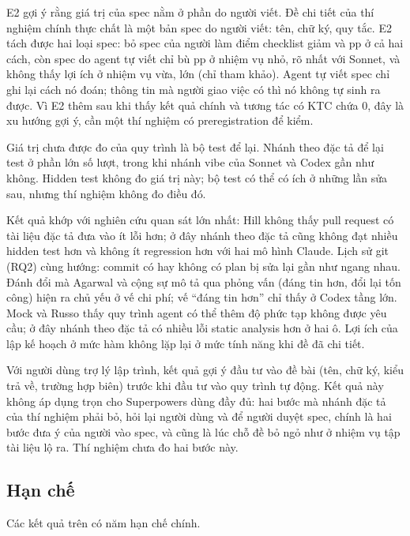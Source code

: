 E2 gợi ý rằng giá trị của spec nằm ở phần do người viết. Đề chi tiết của thí nghiệm chính thực chất là một bản spec do
người viết: tên, chữ ký, quy tắc. E2 tách được hai loại spec: bỏ spec của người làm điểm checklist giảm
\NumETwoXScoreShiftSpec{} và \NumETwoXScoreShiftVibe{} pp ở cả hai cách, còn spec do agent tự viết chỉ bù
\NumETwoPooledSmallPp{} pp ở nhiệm vụ nhỏ, rõ nhất với Sonnet, và không thấy lợi ích ở nhiệm vụ vừa, lớn (chỉ tham
khảo). Agent tự viết spec chỉ ghi lại cách nó đoán; thông tin mà người giao việc có thì nó không tự sinh ra
được. Vì E2 thêm sau khi thấy kết quả chính và tương tác có KTC chứa 0, đây là xu hướng gợi ý, cần một thí
nghiệm có preregistration để kiểm.

Giá trị chưa được đo của quy trình là bộ test để lại. Nhánh theo đặc tả để lại test ở phần lớn số lượt,
trong khi nhánh vibe của Sonnet và Codex gần như không. Hidden test không đo giá trị này; bộ test có thể có ích ở những
lần sửa sau, nhưng thí nghiệm không đo điều đó.

Kết quả khớp với nghiên cứu quan sát lớn nhất: Hill \cite{hill_2026} không thấy pull request có tài liệu đặc tả
đưa vào ít lỗi hơn; ở đây nhánh theo đặc tả cũng không đạt nhiều hidden test hơn và không ít regression hơn với hai mô
hình Claude. Lịch sử git (RQ2) cùng hướng: commit có hay không có plan bị sửa lại gần như ngang nhau. Đánh đổi
mà Agarwal và cộng sự \cite{agarwal_2026} mô tả qua phỏng vấn (đáng tin hơn, đổi lại tốn công) hiện ra chủ yếu
ở vế chi phí; vế ``đáng tin hơn'' chỉ thấy ở Codex tầng lớn. Mock và Russo \cite{mock_2026} thấy quy trình
agent có thể thêm độ phức tạp không được yêu cầu; ở đây nhánh theo đặc tả có nhiều lỗi static analysis hơn ở hai ô. Lợi ích
của lập kế hoạch ở mức hàm \cite{jiang_2024} không lặp lại ở mức tính năng khi đề đã chi tiết.

Với người dùng trợ lý lập trình, kết quả gợi ý đầu tư vào đề bài (tên, chữ ký,
kiểu trả về, trường hợp biên) trước khi đầu tư vào quy trình tự động. Kết quả này không áp dụng trọn cho Superpowers dùng đầy đủ: hai bước mà nhánh đặc
tả của thí nghiệm phải bỏ, hỏi lại người dùng và để người duyệt spec, chính là hai bước đưa ý của người vào
spec, và cũng là lúc chỗ đề bỏ ngỏ như ở nhiệm vụ tập tài liệu lộ ra. Thí nghiệm chưa đo hai bước này.

\subsection{Hạn chế}\label{sec:threats}

Các kết quả trên có năm hạn chế chính.

